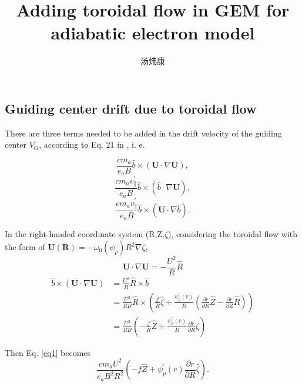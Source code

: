 \documentclass[12pt]{article}
\begin{document}
\begin{CJK*}{UTF8}{gbsn}
\title{\textbf{Adding toroidal flow in GEM for adiabatic electron model}}
\author{汤炜康}
\date{}
\maketitle
\tableofcontents
\newpage

\section{Guiding center drift due to toroidal flow}
There are three terms needed to be added in the drift velocity of the guiding center $V_{G}$, 
according to Eq. 21 in \cite{sugama98}, i. e.  

\begin{equation}
    \frac{cm_a}{e_aB}\hat{b} \times (\mathbf{U} \cdot \nabla \mathbf{U}), \label{eq1}
\end{equation}
\begin{equation}
    \frac{cm_av_{\parallel}^{'}}{e_aB} \hat{b} \times (\hat{b} \cdot \nabla \mathbf{U}), \label{eq2}
\end{equation}
\begin{equation}
    \frac{cm_av_{\parallel}^{'}}{e_aB} \hat{b} \times (\mathbf{U} \cdot\nabla\hat{b}). \label{eq3}
\end{equation}

In the right-handed coordinate system (R,Z,$\zeta$), considering the toroidal flow with the form of $\mathbf{U}(\mathbf{R}) = -\omega_0(\psi_p)R^2 \nabla \zeta$,
\begin{equation}
    \mathbf{U} \cdot \nabla \mathbf{U} = - \frac{U^2}{R} \hat{R}
\end{equation}
\begin{equation}
    \begin{split}
        \hat{b} \times (\mathbf{U} \cdot \nabla \mathbf{U}) &= \frac{U^2}{R} \hat{R} \times \hat{b}\\
        &= \frac{U^2}{RB} \hat{R} \times (\frac{f}{R}\hat{\zeta} + \frac{\psi_{p}^{'}(r)}{R}(\frac{\partial r}{\partial R}\hat{Z} - \frac{\partial r}{\partial Z}\hat{R}))\\
        &= \frac{U^2}{RB} (-\frac{f}{R}\hat{Z} + \frac{\psi_{p}^{'}(r)}{R} \frac{\partial r}{\partial R}\hat{\zeta}) \label{eq5}
    \end{split}
\end{equation}

Then Eq. \ref{eq1} becomes  
\begin{equation}
    \frac{cm_aU^2}{e_aB^2R^2}(-f\hat{Z} + \psi_{p}^{'}(r)\frac{\partial r}{\partial R} \hat{\zeta}).
\end{equation}


\end{CJK*}
\end{document}
